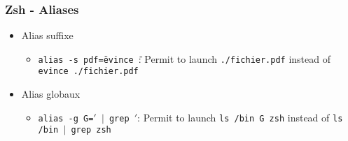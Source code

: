 \subsubsection{Zsh - Aliases}
\begin{frame}[fragile]{\subsubsecname}
  \begin{itemize}
    \item Alias suffixe
      \begin{itemize}
        \item \texttt{alias -s pdf=\"evince \"}: Permit to launch \texttt{./fichier.pdf} instead of \texttt{evince ./fichier.pdf}
      \end{itemize}
    \item Alias globaux
      \begin{itemize}
        \item \texttt{alias -g G=$'$ $|$ grep $'$}: Permit to launch \texttt{ls /bin G zsh} instead of \texttt{ls /bin $|$ grep zsh}
      \end{itemize}
  \end{itemize}
\end{frame}
